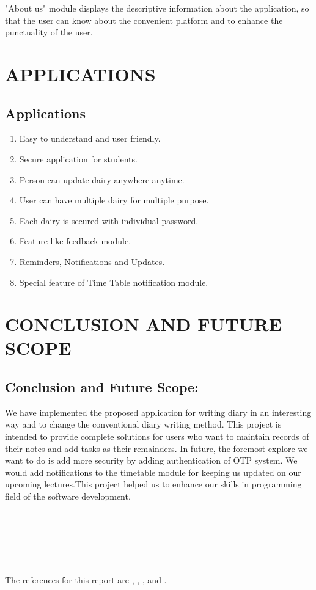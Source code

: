 \documentclass[12pt,a4paper]{report}
\begin{document}
\newpage
\begin{figure}[h]
\end{figure}
"About us" module displays the descriptive information about the application, so that the user can know about the convenient platform and to enhance the punctuality of the user.



\chapterfont{}
\setcounter{secnumdepth}{4}
\chapter {APPLICATIONS}
\section{Applications}
\Large
\begin{enumerate}[label=\roman*.]
\item Easy to understand and user friendly.
\item Secure application for students.
\item Person can update dairy anywhere anytime. 
\item User can have multiple dairy for multiple purpose.
\item Each dairy is secured with individual password.
\item Feature like feedback module.
\item Reminders, Notifications and Updates.
\item Special feature of Time Table notification module.
\end{enumerate}


\chapterfont{}
\setcounter{secnumdepth}{4}
\chapter {CONCLUSION AND FUTURE SCOPE}
\section{Conclusion and Future Scope:}
We have implemented the proposed application for writing diary in an interesting way and to change the conventional diary writing method. This project is intended to provide complete solutions for users who want to maintain records of their notes and add tasks as their remainders. In future, the foremost explore we want to do is add more security by adding authentication of OTP system. We would add notifications to the timetable module for keeping us updated on our upcoming lectures.This project helped us to enhance our skills in programming field of the software development. \\
\\
\\
\\
\\
\\
\\

The references for this report are \cite{sohn2008diary} , \cite{brown2000electronic} , \cite{adeyanjudevelopment} , \cite{lev2019viewing} and \cite{park2016digital}.


 
\end{document}
